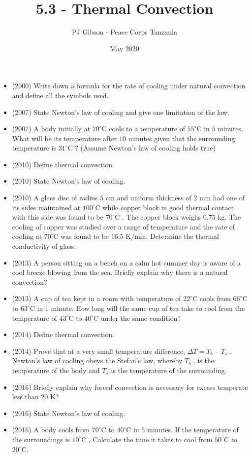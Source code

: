 \documentclass{article}
\title{\textbf{5.3 - Thermal Convection}}
\author{PJ Gibson - Peace Corps Tanzania}
\date{May 2020}
\begin{document}
\maketitle

\begin{itemize}
\item (2000)  Write down a formula for the rate of cooling under natural convection and define all the symbols used. 
\item (2007)  State Newton’s law of cooling and give one limitation of the law.
\item (2007)  A body initially at $ 70^{\circ}$C cools to a temperature of $ 55^{\circ}$C in $ 5$ minutes. What will be its temperature after $ 10$ minutes given that the surrounding temperature is $ 31^{\circ}$C ? (Assume Newton’s law of cooling holds true)
\item (2010)  Define thermal convection.
\item (2010)  State Newton’s law of cooling.
\item (2010)  A glass disc of radius $ 5$ cm and uniform thickness of $ 2$ mm had one of its sides maintained at $ 100^{\circ}$C while copper block in good thermal contact with this side was found to be $ 70^{\circ}$C . The copper block weighs $ 0.75$ kg. The cooling of copper was studied over a range of temperature and the rate of cooling at $ 70^{\circ}$C was found to be $ 16.5$ K$/$min. Determine the thermal conductivity of glass.
\item (2013)  A person sitting on a bench on a calm hot summer day is aware of a cool breeze blowing from the sea. Briefly explain why there is a natural convection?
\item (2013)  A cup of tea kept in a room with temperature of $ 22^{\circ}$C cools from $ 66^{\circ}$C to $ 63^{\circ}$C in $ 1$ minute. How long will the same cup of tea take to cool from the temperature of $ 43^{\circ}$C to $ 40^{\circ}$C under the same condition?
\item (2014)  Define thermal convection.
\item (2014)  Prove that at a very small temperature difference, $ \Delta T=T_{b}$ – $ T_{s}$ ,  Newton's law of cooling obeys the Stefan’s law, whereby $ T_{b}$ , is the temperature of the body and $ T_{s}$ is the temperature of the surrounding. 
\item (2016)  Briefly explain why forced convection is necessary for excess temperate less than $ 20$ K? 
\item (2016)  State Newton’s law of cooling. 
\item (2016)  A body cools from $ 70^{\circ}$C to $ 40^{\circ}$C in $ 5$ minutes. If the temperature of the surroundings is $ 10^{\circ}$C , Calculate the time it takes to cool from $ 50^{\circ}$C to $ 20^{\circ}$C.  
\end{itemize}
\end{document}
